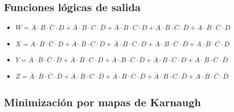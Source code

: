 \subsection{Funciones lógicas de salida}
\begin{itemize}
    \item $W = \overline{A} \cdot B \cdot \overline{C} \cdot D + \overline{A} \cdot B \cdot C \cdot \overline{D} + \overline{A} \cdot B \cdot C \cdot D + A \cdot \overline{B} \cdot \overline{C} \cdot \overline{D} + A \cdot \overline{B} \cdot \overline{C} \cdot D$
    \item $X = \overline{A} \cdot \overline{B} \cdot \overline{C} \cdot D + \overline{A} \cdot \overline{B} \cdot C \cdot \overline{D} + \overline{A} \cdot \overline{B} \cdot C \cdot D  + \overline{A} \cdot B \cdot \overline{C} \cdot \overline{D} + A \cdot \overline{B} \cdot \overline{C} \cdot D$
    \item $Y = \overline{A} \cdot \overline{B} \cdot \overline{C} \cdot \overline{D} + \overline{A} \cdot \overline{B} \cdot C \cdot D + \overline{A} \cdot B \cdot \overline{C} \cdot \overline{D} + \overline{A} \cdot B \cdot C \cdot D + A \cdot \overline{B} \cdot \overline{C} \cdot \overline{D}$
    \item $Z = \overline{A} \cdot \overline{B} \cdot \overline{C} \cdot \overline{D} + \overline{A} \cdot \overline{B} \cdot C \cdot \overline{D} + \overline{A} \cdot B \cdot \overline{C} \cdot \overline{D} + \overline{A} \cdot B \cdot C \cdot \overline{D} + A \cdot \overline{B} \cdot \overline{C} \cdot \overline{D}$
\end{itemize}

\saltoPag

\subsection{Minimización por mapas de Karnaugh}



